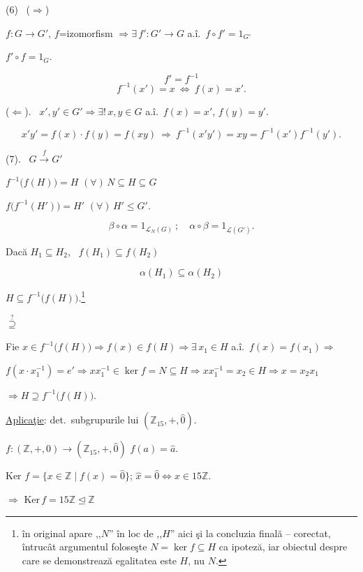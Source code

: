 \documentclass[12pt]{article}
\begin{document}
\noindent (6) \ ($\Rightarrow$)

\noindent $f:G\to G'$, $f$=izomorfism $\Rightarrow \exists\,f':G'\to G$ a.î.\ $f\circ f'=1_{G'}$

\noindent $f'\circ f=1_G$.

\[
f'=f^{-1}
\]
\[
f^{-1}(x')=x \ \Leftrightarrow \ f(x)=x'.
\]

\bigskip
\noindent ($\Leftarrow$). \ $x',y'\in G' \Rightarrow \exists!\,x,y\in G$ a.î.\ $f(x)=x'$, $f(y)=y'$.

\[
x'y' = f(x)\cdot f(y) = f(xy) \ \Rightarrow \ f^{-1}(x'y') = xy = f^{-1}(x')f^{-1}(y').
\]

\bigskip
\noindent (7). \ $G \xrightarrow{f} G'$

\noindent $f^{-1}\big(f(H)\big)= H$ \quad $(\forall)\,N\subseteq H\subseteq G$

\noindent $f\big(f^{-1}(H')\big) = H'$ \quad $(\forall)\,H'\leq G'$.

\[
\beta\circ\alpha = 1_{\mathcal{L}_N(G)} \ ; \quad \alpha\circ\beta = 1_{\mathcal{L}(G')}.
\]

\bigskip
\noindent Dacă $H_1\subseteq H_2$, \ $f(H_1)\subseteq f(H_2)$

\[
\alpha(H_1) \subseteq \alpha(H_2)
\]

\bigskip
\noindent $H\subseteq f^{-1}\big(f(H)\big)$.\footnote{în original apare ,,$N$'' în loc de ,,$H$'' aici şi la concluzia finală -- corectat, întrucât argumentul foloseşte $N=\ker f\subseteq H$ ca ipoteză, iar obiectul despre care se demonstrează egalitatea este $H$, nu $N$.}

\noindent $\overset{?}{\supseteq}$

\noindent Fie $x\in f^{-1}\big(f(H)\big) \Rightarrow f(x)\in f(H) \Rightarrow \exists\,x_1\in H$ a.î.\ $f(x)=f(x_1) \Rightarrow$

\noindent $f(x\cdot x_1^{-1}) = e' \Rightarrow xx_1^{-1}\in\ker f = N\subseteq H \Rightarrow xx_1^{-1} = x_2\in H \Rightarrow x=x_2x_1$

\noindent $\Rightarrow H\supseteq f^{-1}\big(f(H)\big)$.

\bigskip
\noindent\underline{Aplicaţie}: det.\ subgrupurile lui $(\mathbb{Z}_{15},+,\hat 0)$.

\noindent $f:(\mathbb{Z},+,0) \to (\mathbb{Z}_{15},+,\hat 0)$ \quad $f(a)=\hat a$.

\bigskip
\noindent Ker $f = \{x\in\mathbb{Z} \mid f(x)=\hat 0\}$; \quad $\hat x=\hat 0 \Leftrightarrow x\in 15\mathbb{Z}$.

\noindent $\Rightarrow$ Ker$\,f = 15\mathbb{Z} \trianglelefteq \mathbb{Z}$
\end{document}
